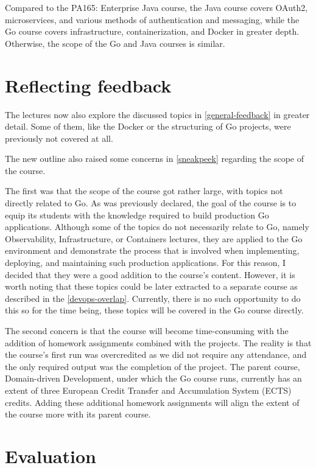 \documentclass[
  digital,
  color,
  oneside,
  nosansbold,
  nocolorbold,
  nolof,
  nolot,
]{fithesis4}
\begin{document}
Compared to the PA165: Enterprise Java course, the Java course covers OAuth2, microservices, and various methods of authentication and messaging, while the Go course covers infrastructure, containerization, and Docker in greater depth. Otherwise, the scope of the Go and Java courses is similar.

\section{Reflecting feedback}\label{reflect-feedback}

The lectures now also explore the discussed topics in \cref{general-feedback} in greater detail. Some of them, like the Docker or the structuring of Go projects, were previously not covered at all.

The new outline also raised some concerns in \cref{sneakpeek} regarding the scope of the course. 

The first was that the scope of the course got rather large, with topics not directly related to Go. As was previously declared, the goal of the course is to equip its students with the knowledge required to build production Go applications. Although some of the topics do not necessarily relate to Go, namely Observability, Infrastructure, or Containers lectures, they are applied to the Go environment and demonstrate the process that is involved when implementing, deploying, and maintaining such production applications. For this reason, I decided that they were a good addition to the course's content. However, it is worth noting that these topics could be later extracted to a separate course as described in the \cref{devops-overlap}. Currently, there is no such opportunity to do this so for the time being, these topics will be covered in the Go course directly.

The second concern is that the course will become time-consuming with the addition of homework assignments combined with the projects. The reality is that the course's first run was overcredited as we did not require any attendance, and the only required output was the completion of the project. The parent course, Domain-driven Development, under which the Go course runs, currently has an extent of three European Credit Transfer and Accumulation System (ECTS) credits. Adding these additional homework assignments will align the extent of the course more with its parent course.

\section{Evaluation}
\end{document}
